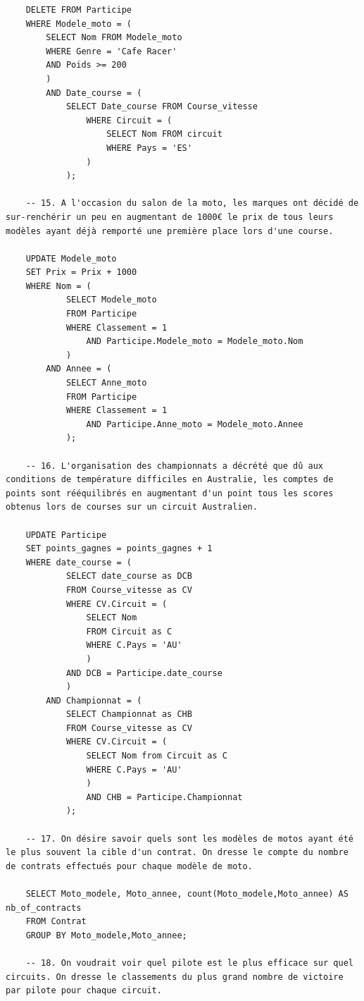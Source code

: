 \documentclass[12pt,a4paper]{article}
\newenvironment{code}{\captionsetup{type=listing}}{}
\begin{document}
\begin{code}
\begin{verbatim}
    DELETE FROM Participe
    WHERE Modele_moto = (
        SELECT Nom FROM Modele_moto
        WHERE Genre = 'Cafe Racer'
        AND Poids >= 200
        )
        AND Date_course = (
            SELECT Date_course FROM Course_vitesse
                WHERE Circuit = (
                    SELECT Nom FROM circuit
                    WHERE Pays = 'ES'
                )
            );

    -- 15. A l'occasion du salon de la moto, les marques ont décidé de sur-renchérir un peu en augmentant de 1000€ le prix de tous leurs modèles ayant déjà remporté une première place lors d'une course.

    UPDATE Modele_moto
    SET Prix = Prix + 1000
    WHERE Nom = (
            SELECT Modele_moto
            FROM Participe
            WHERE Classement = 1
                AND Participe.Modele_moto = Modele_moto.Nom
            )
        AND Annee = (
            SELECT Anne_moto
            FROM Participe
            WHERE Classement = 1
                AND Participe.Anne_moto = Modele_moto.Annee
            );

    -- 16. L'organisation des championnats a décrété que dû aux conditions de température difficiles en Australie, les comptes de points sont rééquilibrés en augmentant d'un point tous les scores obtenus lors de courses sur un circuit Australien.

    UPDATE Participe
    SET points_gagnes = points_gagnes + 1
    WHERE date_course = (
            SELECT date_course as DCB
            FROM Course_vitesse as CV
            WHERE CV.Circuit = (
                SELECT Nom
                FROM Circuit as C
                WHERE C.Pays = 'AU'
                )
            AND DCB = Participe.date_course
            )
        AND Championnat = (
            SELECT Championnat as CHB
            FROM Course_vitesse as CV
            WHERE CV.Circuit = (
                SELECT Nom from Circuit as C
                WHERE C.Pays = 'AU'
                )
                AND CHB = Participe.Championnat
            );

    -- 17. On désire savoir quels sont les modèles de motos ayant été le plus souvent la cible d'un contrat. On dresse le compte du nombre de contrats effectués pour chaque modèle de moto.

    SELECT Moto_modele, Moto_annee, count(Moto_modele,Moto_annee) AS nb_of_contracts
    FROM Contrat
    GROUP BY Moto_modele,Moto_annee;

    -- 18. On voudrait voir quel pilote est le plus efficace sur quel circuits. On dresse le classements du plus grand nombre de victoire par pilote pour chaque circuit.


\end{verbatim}
\end{code}
\end{document}
